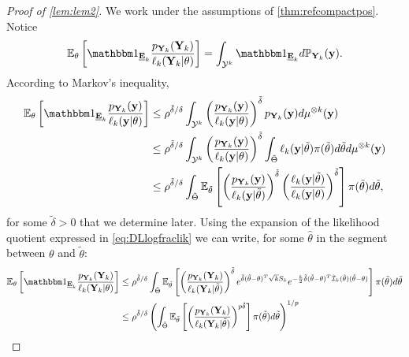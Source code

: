 \begin{proof}[Proof of \cref{lem:lem2}]
    We work under the assumptions of \cref{thm:refcompactpos}.
Notice
    \begin{equation}
        \EE_\theta\left[ \indic_{\ubf E_k} \frac{p_{\mbf Y_k}(\mbf Y_k)}{\ell_k(\mbf Y_k|\theta)} \right] = \int_{\cY^k} \indic_{\ubf E_k} d\PP_{\mbf Y_k}(\mbf y).
    \end{equation}
According to Markov's inequality,
    \begin{align}
\nonumber        \EE_\theta\left[ \indic_{\ubf E_k} \frac{p_{\mbf Y_k}(\mbf y)}{\ell_k(\mbf y|\theta)} \right]
            &\leq \rho^{\tilde\delta/\delta} \int_{\cY^k}\left( \frac{p_{\mbf Y_k}(\mbf y)}{\ell_k(\mbf y|\theta)} \right)^{\tilde\delta} p_{\mbf Y_k}(\mbf y)d\mu^{\otimes k}(\mbf y) \\
\nonumber
&\leq \rho^{\tilde\delta/\delta} \int_{\cY^k} \left( \frac{p_{\mbf Y_k}(\mbf y)}{\ell_k(\mbf y|\theta)} \right)^{\tilde\delta} \int_{\tilde\Theta}\ell_k(\mbf y|\tilde\theta)\pi(\tilde\theta) d\tilde\theta d\mu^{\otimes k}(\mbf y)\\
            &\leq \rho^{\tilde\delta/\delta} \int_{\tilde\Theta} \EE_{\tilde\theta}\left[ \left( \frac{p_{\mbf Y_k}(\mbf y)}{\ell_k(\mbf y|\tilde\theta)} \right)^{\tilde\delta} \left( \frac{\ell_k(\mbf y|\tilde\theta)}{\ell_k(\mbf y|\theta)} \right)^{\tilde\delta} \right] \pi(\tilde\theta)d\tilde\theta  ,
    \end{align}
for some $\tilde\delta>0$ that we determine later. 
Using the expansion of the likelihood quotient expressed in \cref{eq:DLlogfraclik} we can write, for some $\hat\theta$ in the segment between $\theta$ and $\tilde\theta$:
    \begin{align}
    \nonumber
         \EE_\theta\left[ \indic_{\ubf E_k} \frac{p_{\mbf Y_k}(\mbf Y_k)}{\ell_k(\mbf Y_k|\theta)} \right]
             &\leq \rho^{\tilde\delta/\delta}\int_{\tilde\Theta} \EE_{\tilde\theta}\left[ \left( \frac{p_{\mbf Y_k}(\mbf Y_k)}{\ell_k(\mbf Y_k|\tilde\theta)} \right)^{\tilde\delta}  e^{{\tilde\delta}(\tilde\theta-\theta)^T\sqrt{k}S_k} e^{-\frac{k}{2}{\tilde\delta}(\tilde\theta-\theta)^T\hat\cI_k(\hat\theta)(\tilde\theta-\theta)} \right] \pi(\tilde\theta) d\tilde\theta  \\
        \nonumber
            &\leq \rho^{\tilde\delta/\delta} \left(\int_{\tilde\Theta} \EE_{\tilde\theta} \left[ \left( \frac{p_{\mbf Y_k}(\mbf Y_k)}{\ell_k(\mbf Y_k|\tilde\theta)} \right)^{p{\tilde\delta}}\right] \pi(\tilde\theta)d\tilde\theta \right)^{1/p}\\

\end{align}
\end{proof}

